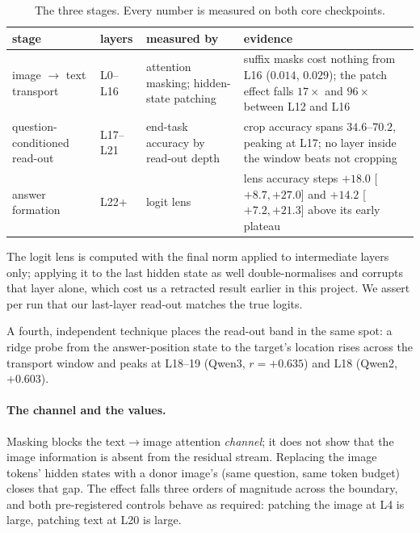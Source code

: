 \begin{table}[h]\centering\small
\caption{The three stages. Every number is measured on both core checkpoints.}
\setlength{\tabcolsep}{4pt}\begin{tabular}{p{2.2cm}p{1.35cm}p{2.8cm}p{5.5cm}}
\toprule
stage & layers & measured by & evidence\\
\midrule
image $\to$ text transport & L0--L16 & attention masking; hidden-state patching & suffix masks cost nothing from L16 ($0.014$, $0.029$); the patch effect falls $17\times$ and $96\times$ between L12 and L16\\
question-conditioned read-out & L17--L21 & end-task accuracy by read-out depth & crop accuracy spans $34.6$--$70.2$, peaking at L17; no layer inside the window beats not cropping\\
answer formation & L22+ & logit lens & lens accuracy steps $+18.0$ [$+8.7,+27.0$] and $+14.2$ [$+7.2,+21.3$] above its early plateau\\
\bottomrule
\end{tabular}\label{tab:stages}
\end{table}

The logit lens is computed with the final norm applied to intermediate layers only; applying it to the last hidden
state as well double-normalises and corrupts that layer alone, which cost us a retracted result earlier in this
project. We assert per run that our last-layer read-out matches the true logits.

A fourth, independent technique places the read-out band in the same spot: a ridge probe from the
answer-position state to the target's location rises across the transport window and peaks at L18--19 (Qwen3,
$r=+0.635$) and L18 (Qwen2, $+0.603$).

\paragraph{The channel and the values.} Masking blocks the text$\to$image attention \emph{channel}; it does not
show that the image information is absent from the residual stream. Replacing the image tokens' hidden states
with a donor image's (same question, same token budget) closes that gap. The effect falls three orders of
magnitude across the boundary, and both pre-registered controls behave as required: patching the image at L4 is
large, patching text at L20 is large.


